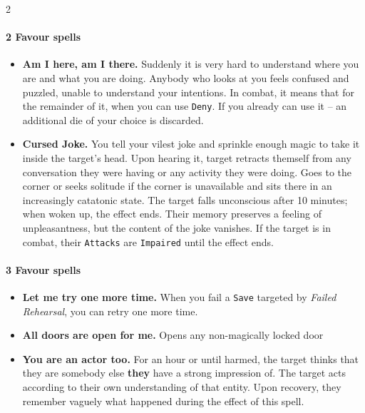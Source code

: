 \begin{multicols*}{2}
\paragraph{2 Favour spells}
\begin{itemize}[nosep, leftmargin=*]
    \item[\ding{108}] \textbf{Am I here, am I there.} Suddenly it is very hard to understand where you are and what you are doing.
 Anybody who looks at you feels confused and puzzled, unable to understand your intentions.
 In combat, it means that for the remainder of it, when you can use \texttt{Deny}. If you already can use it --  an additional die of your choice is discarded.
    \item[\ding{108}] \textbf{Cursed Joke.} You tell your vilest joke and sprinkle enough magic to take it inside the target's head. Upon hearing it, target retracts themself from any conversation they were having or any activity they were doing.
 Goes to the corner or seeks solitude if the corner is unavailable and sits there in an increasingly catatonic state. The target falls unconscious after 10 minutes; when woken up, the effect ends.
 Their memory preserves a feeling of unpleasantness, but the content of the joke vanishes.
 If the target is in combat, their \texttt{Attacks} are \texttt{Impaired} until the effect ends.
\end{itemize}
\paragraph{3 Favour spells}
\begin{itemize}[nosep, leftmargin=*]
    \item[\ding{108}] \textbf{Let me try one more time.} When you fail a \texttt{Save} targeted by \textit{Failed Rehearsal}, you can retry one more time.
    \item[\ding{108}] \textbf{All doors are open for me.} Opens any non-magically locked door
    \item[\ding{108}] \textbf{You are an actor too.} For an hour or until harmed, the target thinks that they are somebody else \textbf{they} have a strong impression of.
 The target acts according to their own understanding of that entity.
 Upon recovery, they remember vaguely what happened during the effect of this spell.
\end{itemize}

\end{multicols*}
